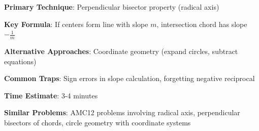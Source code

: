 \documentclass[12pt]{article}
\begin{document}
\textbf{Primary Technique}: Perpendicular bisector property (radical axis)

\textbf{Key Formula}: If centers form line with slope $m$, intersection chord has slope $-\frac{1}{m}$

\textbf{Alternative Approaches}: Coordinate geometry (expand circles, subtract equations)

\textbf{Common Traps}: Sign errors in slope calculation, forgetting negative reciprocal

\textbf{Time Estimate}: 3-4 minutes

\textbf{Similar Problems}: AMC12 problems involving radical axis, perpendicular bisectors of chords, circle geometry with coordinate systems
\end{document}
